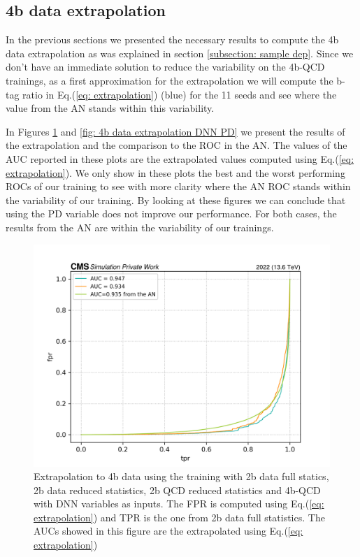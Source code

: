 \subsection{4b data extrapolation} \label{subsection:4b data extrapolation inclusivce}

In the previous sections we presented the necessary results to compute the 4b data extrapolation as was explained in section \ref{subsection: sample dep}. Since we don't have an immediate solution to reduce the variability on the 4b-QCD trainings, as a first approximation for the extrapolation we will compute the b-tag ratio in Eq.(\ref{eq: extrapolation}) (\textcolor{BlueGreen}{blue}) for the 11 seeds and see where the value from the AN stands within this variability.

In Figures \ref{fig: 4b data extrapolation DNN} and \ref{fig: 4b data extrapolation DNN PD} we present the results of the extrapolation and the comparison to the ROC in the AN. The values of the AUC reported in these plots are the extrapolated values computed using Eq.(\ref{eq: extrapolation}). We only show in these plots the best and the worst performing ROCs of our training to see with more clarity where the AN ROC stands within the variability of our training. By looking at these figures we can conclude that using the PD variable does not improve our performance. For both cases, the results from the AN are within the variability of our trainings. 

\begin{figure}[hbt]
    \centering
    \includegraphics[width=0.7\linewidth]{Images/7.S:B/Extrapolation/4b data dnn.png}
    \caption{Extrapolation to 4b data using the training with 2b data full statics, 2b data reduced statistics, 2b QCD reduced statistics and 4b-QCD with DNN variables as inputs. The FPR is computed using Eq.(\ref{eq: extrapolation}) and TPR is the one from 2b data full statistics. The AUCs showed in this figure are the extrapolated using Eq.(\ref{eq: extrapolation})}
    \label{fig: 4b data extrapolation DNN}
\end{figure}

